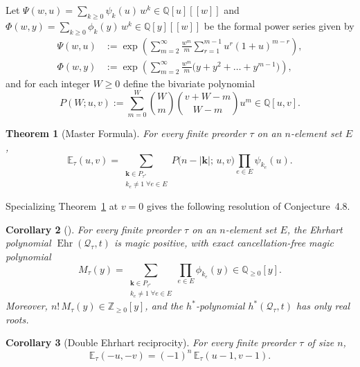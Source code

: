 \documentclass[11pt,letterpaper]{article}
\theoremstyle{result}
\newtheorem{theorem}{Theorem}[section]
\newtheorem{corollary}[theorem]{Corollary}
\theoremstyle{definition}
\theoremstyle{remark}
\newcommand{\ZZ}{\mathbb{Z}}
\newcommand{\QQ}{\mathbb{Q}}
\newcommand{\biE}{\mathbb{E}}
\newcommand{\qQ}{\mathcal{Q}}
\newcommand{\Ehr}{\operatorname{Ehr}}
\begin{document}
Let $\Psi(w,u)=\sum_{k\ge 0}\psi_k(u)\,w^k\in\QQ[u][[w]]$ and $\Phi(w,y)=\sum_{k\ge 0}\phi_k(y)\,w^k\in\QQ[y][[w]]$ be the formal power series given by
\begin{equation}\label{eq:Psi-Phi}
\begin{aligned}
\Psi(w,u) &:= \exp\!\left(\sum_{m=2}^{\infty}\frac{w^m}{m}\sum_{r=1}^{m-1} u^r(1+u)^{m-r}\right), \\
\Phi(w,y) &:= \exp\!\left(\sum_{m=2}^{\infty}\frac{w^m}{m}\bigl(y+y^2+\dots+y^{m-1}\bigr)\right),
\end{aligned}
\end{equation}
and for each integer $W\ge 0$ define the bivariate polynomial
\begin{equation}\label{eq:P-poly}
P(W; u, v) := \sum_{m=0}^{W}\binom{W}{m}\binom{v+W-m}{W-m} u^m \in \QQ[u,v].
\end{equation}

\begin{theorem}[Master Formula]\label{thm:master}
For every finite preorder $\tau$ on an $n$-element set $E$,
\begin{equation}\label{eq:master}
\biE_\tau(u,v) = \sum_{\substack{\mathbf{k}\in P_{\tau^*} \\ k_e\ne 1 \;\forall e\in E}} P\bigl(n-|\mathbf{k}|;\, u, v\bigr) \prod_{e\in E} \psi_{k_e}(u).
\end{equation}
\end{theorem}

\begin{samepage}
Specializing Theorem~\ref{thm:master} at $v=0$ gives the following resolution of Conjecture~4.8.\par\nopagebreak
\begin{corollary}[{\cite[Conjecture~4.8]{AC26}}]\label{cor:magic}
For every finite preorder $\tau$ on an $n$-element set $E$, the Ehrhart polynomial $\Ehr(\qQ_\tau, t)$ is magic positive, with exact cancellation-free magic polynomial
\begin{equation}\label{eq:magic-master}
M_\tau(y) = \sum_{\substack{\mathbf{k}\in P_{\tau^*} \\ k_e\ne 1 \;\forall e\in E}} \prod_{e\in E} \phi_{k_e}(y) \in \QQ_{\ge 0}[y].
\end{equation}
Moreover, $n!\,M_\tau(y)\in\ZZ_{\ge 0}[y]$, and the $h^*$-polynomial $h^*(\qQ_\tau, t)$ has only real roots.
\end{corollary}
\end{samepage}

\begin{corollary}[Double Ehrhart reciprocity]\label{cor:double}
For every finite preorder $\tau$ of size $n$,
\[
\biE_\tau(-u, -v) = (-1)^n\, \biE_\tau(u-1, v-1).
\]
\end{corollary}
\end{document}
